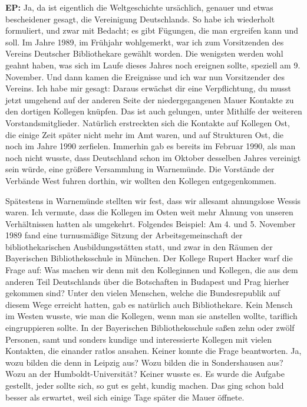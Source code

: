 \documentclass[a4paper,
fontsize=11pt,
oneside,
numbers=noperiodatend,
parskip=half-,
bibliography=totoc,
final
]{scrartcl}
\begin{document}
\textbf{EP:} Ja, da ist eigentlich die Weltgeschichte ursächlich,
genauer und etwas bescheidener gesagt, die Vereinigung Deutschlands. So
habe ich wiederholt formuliert, und zwar mit Bedacht; es gibt Fügungen,
die man ergreifen kann und soll. Im Jahre 1989, im Frühjahr wohlgemerkt,
war ich zum Vorsitzenden des Vereins Deutscher Bibliothekare gewählt
worden. Die wenigsten werden wohl geahnt haben, was sich im Laufe dieses
Jahres noch ereignen sollte, speziell am 9. November. Und dann kamen die
Ereignisse und ich war nun Vorsitzender des Vereins. Ich habe mir
gesagt: Daraus erwächst dir eine Verpflichtung, du musst jetzt umgehend
auf der anderen Seite der niedergegangenen Mauer Kontakte zu den
dortigen Kollegen knüpfen. Das ist auch gelungen, unter Mithilfe der
weiteren Vorstandsmitglieder. Natürlich erstreckten sich die Kontakte
auf Kollegen Ost, die einige Zeit später nicht mehr im Amt waren, und
auf Strukturen Ost, die noch im Jahre 1990 zerfielen. Immerhin gab es
bereits im Februar 1990, als man noch nicht wusste, dass Deutschland
schon im Oktober desselben Jahres vereinigt sein würde, eine größere
Versammlung in Warnemünde. Die Vorstände der Verbände West fuhren
dorthin, wir wollten den Kollegen entgegenkommen.

Spätestens in Warnemünde stellten wir fest, dass wir allesamt
ahnungslose Wessis waren. Ich vermute, dass die Kollegen im Osten weit
mehr Ahnung von unseren Verhältnissen hatten als umgekehrt. Folgendes
Beispiel: Am 4. und 5. November 1989 fand eine turnusmäßige Sitzung der
Arbeitsgemeinschaft der bibliothekarischen Ausbildungsstätten statt, und
zwar in den Räumen der Bayerischen Bibliotheksschule in München. Der
Kollege Rupert Hacker warf die Frage auf: Was machen wir denn mit den
Kolleginnen und Kollegen, die aus dem anderen Teil Deutschlands über die
Botschaften in Budapest und Prag hierher gekommen sind? Unter den vielen
Menschen, welche die Bundesrepublik auf diesem Wege erreicht hatten, gab
es natürlich auch Bibliothekare. Kein Mensch im Westen wusste, wie man
die Kollegen, wenn man sie anstellen wollte, tariflich eingruppieren
sollte. In der Bayerischen Bibliotheksschule saßen zehn oder zwölf
Personen, samt und sonders kundige und interessierte Kollegen mit vielen
Kontakten, die einander ratlos ansahen. Keiner konnte die Frage
beantworten. Ja, wozu bilden die denn in Leipzig aus? Wozu bilden die in
Sondershausen aus? Wozu an der Humboldt-Universität? Keiner wusste es.
Es wurde die Aufgabe gestellt, jeder sollte sich, so gut es geht, kundig
machen. Das ging schon bald besser als erwartet, weil sich einige Tage
später die Mauer öffnete.
\end{document}
